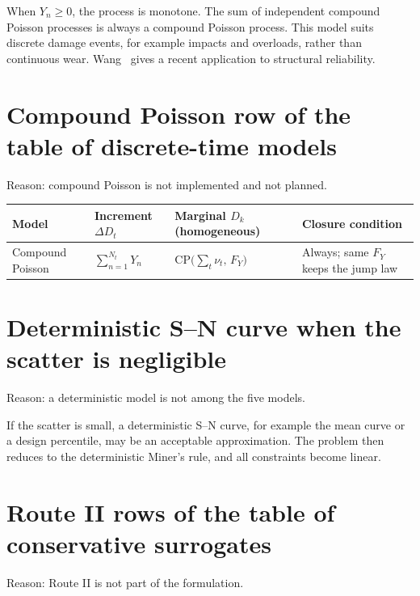 \documentclass[11pt,a4paper]{article}
\theoremstyle{plain}
\theoremstyle{definition}
\theoremstyle{remark}
\begin{document}
When $Y_n \ge 0$, the process is monotone.
The sum of independent compound Poisson processes is always a compound Poisson process.
This model suits discrete damage events, for example impacts and overloads, rather than continuous wear.
Wang~\cite{Wang2022} gives a recent application to structural reliability.


\section{Compound Poisson row of the table of discrete-time models}

Reason: compound Poisson is not implemented and not planned.

\begin{center}
\small
\begin{tabularx}{\linewidth}{@{}>{\hsize=0.613\hsize\raggedright\arraybackslash}X>{\hsize=0.993\hsize\raggedright\arraybackslash}X>{\hsize=1.168\hsize\raggedright\arraybackslash}X>{\hsize=1.226\hsize\raggedright\arraybackslash}X@{}}
\toprule
\rowcolor{headgrey}
\textbf{Model} & \textbf{Increment} $\Delta D_t$ & \textbf{Marginal} $D_k$ (homogeneous) & \textbf{Closure condition} \\
\midrule
Compound Poisson
  & $\sum_{n=1}^{N_t} Y_n$
  & $\mathrm{CP}\!\bigl(\sum_t\nu_t,\,F_Y\bigr)$
  & Always; same $F_Y$ keeps the jump law \\
\bottomrule
\end{tabularx}
\end{center}

\section{Deterministic S--N curve when the scatter is negligible}

Reason: a deterministic model is not among the five models.

If the scatter is small, a deterministic S--N curve, for example the mean curve or a design percentile, may be an acceptable approximation.
The problem then reduces to the deterministic Miner's rule, and all constraints become linear.

\section{Route II rows of the table of conservative surrogates}

Reason: Route II is not part of the formulation.
\end{document}
